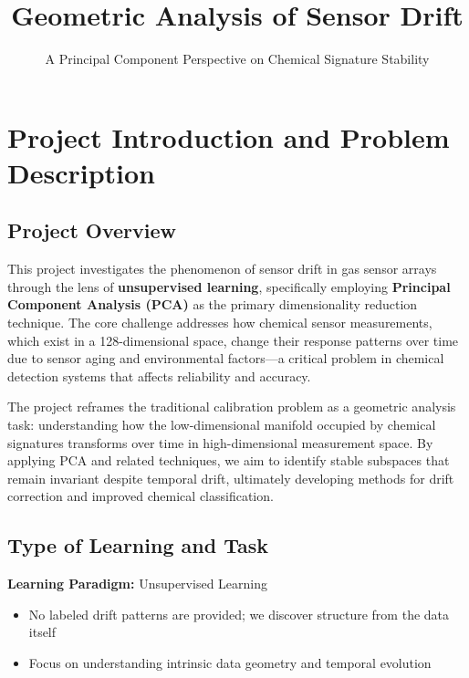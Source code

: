 \documentclass[
  letterpaper,
  DIV=11,
  numbers=noendperiod]{scrartcl}
\title{Geometric Analysis of Sensor Drift}
\subtitle{A Principal Component Perspective on Chemical Signature
Stability}
\author{}
\date{}
\providecommand{\tightlist}{%
  \setlength{\itemsep}{0pt}\setlength{\parskip}{0pt}}
\renewcommand*\contentsname{Table of contents}
\newcommand\contentsname{Table of contents}
\begin{document}
\maketitle

\renewcommand*\contentsname{Table of contents}
{
\hypersetup{linkcolor=}
\setcounter{tocdepth}{3}
\tableofcontents
}

\section{Project Introduction and Problem
Description}\label{project-introduction-and-problem-description}

\subsection{Project Overview}\label{project-overview}

This project investigates the phenomenon of sensor drift in gas sensor
arrays through the lens of \textbf{unsupervised learning}, specifically
employing \textbf{Principal Component Analysis (PCA)} as the primary
dimensionality reduction technique. The core challenge addresses how
chemical sensor measurements, which exist in a 128-dimensional space,
change their response patterns over time due to sensor aging and
environmental factors---a critical problem in chemical detection systems
that affects reliability and accuracy.

The project reframes the traditional calibration problem as a geometric
analysis task: understanding how the low-dimensional manifold occupied
by chemical signatures transforms over time in high-dimensional
measurement space. By applying PCA and related techniques, we aim to
identify stable subspaces that remain invariant despite temporal drift,
ultimately developing methods for drift correction and improved chemical
classification.

\subsection{Type of Learning and Task}\label{type-of-learning-and-task}

\textbf{Learning Paradigm:} Unsupervised Learning

\begin{itemize}
\tightlist
\item
  No labeled drift patterns are provided; we discover structure from the
  data itself
\item
  Focus on understanding intrinsic data geometry and temporal evolution
\end{itemize}
\end{document}
